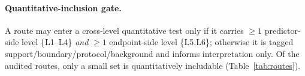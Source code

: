 \paragraph{Quantitative-inclusion gate.} A route may enter a cross-level quantitative test only if it
carries $\geq 1$ predictor-side level \{L1--L4\} \emph{and} $\geq 1$ endpoint-side level \{L5,L6\};
otherwise it is tagged support/boundary/protocol/background and informs interpretation only. Of the
audited routes, only a small set is quantitatively includable (Table~\ref{tab:routes}).
